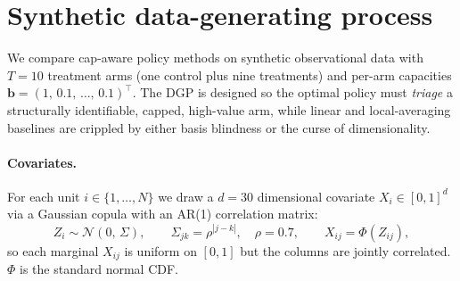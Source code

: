 %
%      

\section{Synthetic data-generating process}
\label{sec:dgp}

We compare cap-aware policy methods on synthetic observational data with
$T = 10$ treatment arms (one control plus nine treatments) and per-arm
capacities $\bm{b} = (1,\, 0.1,\, \ldots,\, 0.1)^\top$.  The DGP is
designed so the optimal policy must \emph{triage} a structurally
identifiable, capped, high-value arm, while linear and local-averaging
baselines are crippled by either basis blindness or the curse of
dimensionality.

\paragraph{Covariates.}
For each unit $i \in \{1,\ldots,N\}$ we draw a $d = 30$ dimensional
covariate $X_i \in [0,1]^{d}$ via a Gaussian copula with an AR(1)
correlation matrix:
\begin{equation}
  Z_i \sim \mathcal{N}\!\left(0,\, \Sigma\right),
  \qquad
  \Sigma_{jk} = \rho^{|j - k|}, \quad \rho = 0.7,
  \qquad
  X_{ij} = \Phi(Z_{ij}),
\end{equation}
so each marginal $X_{ij}$ is uniform on $[0,1]$ but the columns are
jointly correlated.  $\Phi$ is the standard normal CDF.


